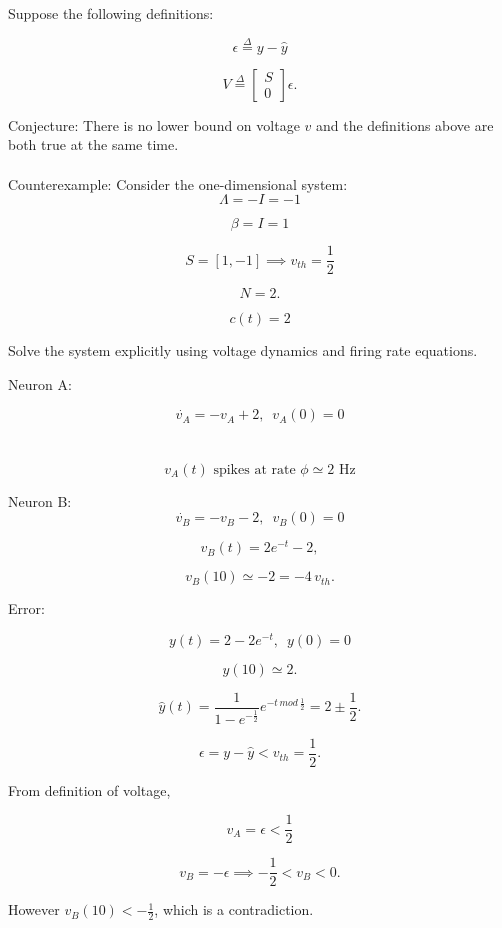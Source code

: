 \clearpage

Suppose the following definitions:

$$\epsilon \overset{\Delta}{=} y - \hat{y}$$

$$ V \overset{\Delta}{=} \begin{bmatrix}
S \\ 0
\end{bmatrix} \epsilon.
$$

Conjecture: There is no lower bound on voltage $v$ and the definitions above are both true at the same time.  
\\
\\
Counterexample: Consider the  one-dimensional system:
$$
\Lambda = -I =  -1 
$$

$$
\beta = I = 1
$$

$$
S = [1, -1] \implies v_{th} = \frac{1}{2}
$$

$$
N = 2.
$$

$$
c(t) = 2
$$

Solve the system explicitly using voltage dynamics and firing rate equations. 

Neuron A: 

$$
\dot{v_A} = -v_A + 2, \, \, \, v_A(0) = 0
$$
\\
\\
$$
v_A(t) \text{ spikes at rate } \phi \simeq 2 \text{ Hz}
$$



Neuron B:
$$
\dot{v_B} = -v_B - 2, \, \, \, v_B(0) = 0
$$

$$
v_B(t) = 2 e^{-t} -2,
$$

$$
v_B(10)  \simeq -2 = - 4 \, v_{th}.
$$


Error:

$$
y(t) = 2 - 2 e^{-t}, \, \, \, y(0) = 0
$$

$$
y(10) \simeq 2.
$$


$$
\hat{y}(t) = \frac{1}  {1 - e^{-\frac{1}{2}}}  e^{-t \, mod \, \frac{1}{2}} = 2 \pm \frac{1}{2}.
$$

$$
\epsilon = y - \hat{y}  < v_{th} = \frac{1}{2}.
$$

From definition of voltage, 

$$
v_A = \epsilon < \frac{1}{2}
$$

$$
v_B = -\epsilon \implies -\frac{1}{2} < v_B < 0.
$$

However $v_B(10) < -\frac{1}{2}$, which is a contradiction. 


\clearpage





















